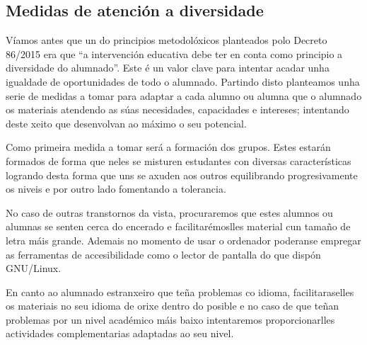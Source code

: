 \subsection{Medidas de atención a diversidade}\label{sec:diversidade}

Víamos antes que un do principios metodolóxicos planteados polo Decreto 86/2015 era que ``a intervención educativa debe ter en conta como principio a diversidade do alumnado''. Este é un valor clave para intentar acadar unha igualdade de oportunidades de todo o alumnado. Partindo disto planteamos unha serie de medidas a tomar para adaptar a cada alumno ou alumna que o alumnado os materiais atendendo as súas necesidades, capacidades e intereses; intentando deste xeito que desenvolvan ao máximo o seu potencial.

Como primeira medida a tomar será a formación dos grupos. Estes estarán formados de forma que neles se misturen estudantes con diversas características logrando desta forma que uns se axuden aos outros equilibrando progresivamente os niveis e por outro lado fomentando a tolerancia.

No caso de outras transtornos da vista, procuraremos que estes alumnos ou alumnas se senten cerca do encerado e facilitarémoslles material cun tamaño de letra máis grande. Ademais no momento de usar o ordenador poderanse empregar as ferramentas de accesibilidade como o lector de pantalla do que dispón GNU/Linux.

En canto ao alumnado estranxeiro que teña problemas co idioma, facilitaraselles os materiais no seu idioma de orixe dentro do posible e no caso de que teñan problemas por un nivel académico máis baixo intentaremos proporcionarlles actividades complementarias adaptadas ao seu nivel.
